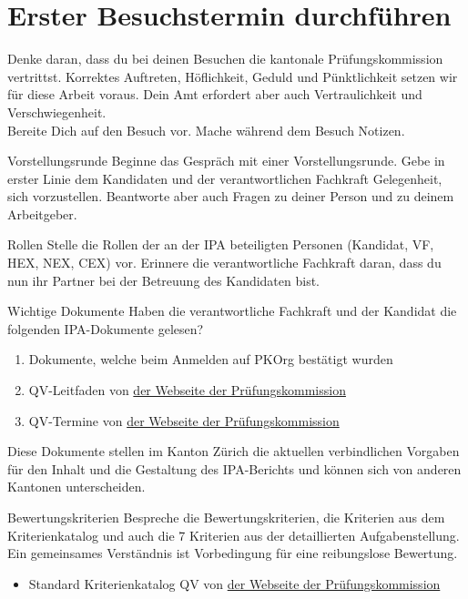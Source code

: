 \section{Erster Besuchstermin durchführen}
Denke daran, dass du bei deinen Besuchen die kantonale Prüfungskommission vertrittst. Korrektes Auftreten, Höflichkeit, Geduld und Pünktlichkeit setzen wir für diese Arbeit voraus. Dein Amt erfordert aber auch Vertraulichkeit und Verschwiegenheit.\\Bereite Dich auf den Besuch vor. Mache während dem Besuch Notizen.

\begin{taskitem}{Vorstellungsrunde}
  Beginne das Gespräch mit einer Vorstellungsrunde. Gebe in erster Linie dem Kandidaten und der verantwortlichen Fachkraft Gelegenheit, sich vorzustellen. Beantworte aber auch Fragen zu deiner Person und zu deinem Arbeitgeber.
\end{taskitem}
\begin{taskitem}{Rollen}
  Stelle die Rollen der an der IPA beteiligten Personen (Kandidat, VF, HEX, NEX, CEX) vor. Erinnere die verantwortliche Fachkraft daran, dass du nun ihr Partner bei der Betreuung des Kandidaten bist.
\end{taskitem}
\begin{taskitemwithoutcomment}{Wichtige Dokumente}
  Haben die verantwortliche Fachkraft und der Kandidat die folgenden IPA-Dokumente gelesen?
  \begin{enumerate}
    \item Dokumente, welche beim Anmelden auf PKOrg bestätigt wurden
    \item QV-Leitfaden von \href{https://pk19.ch}{der Webseite der Prüfungskommission}
    \item QV-Termine von \href{https://pk19.ch}{der Webseite der Prüfungskommission}
  \end{enumerate}
  Diese Dokumente stellen im Kanton Zürich die aktuellen verbindlichen Vorgaben für den Inhalt und die Gestaltung des IPA-Berichts und können sich von anderen Kantonen unterscheiden.
\end{taskitemwithoutcomment}
\newpage
\begin{taskitem}{Bewertungskriterien}
  Bespreche die Bewertungskriterien, die Kriterien aus dem Kriterienkatalog und auch die 7 Kriterien aus der detaillierten Aufgabenstellung.\\Ein gemeinsames Verständnis ist Vorbedingung für eine reibungslose Bewertung.
  \begin{itemize}
    \item Standard Kriterienkatalog QV von \href{https://pk19.ch}{der Webseite der Prüfungskommission}
  \end{itemize}
  ~
\end{taskitem}
